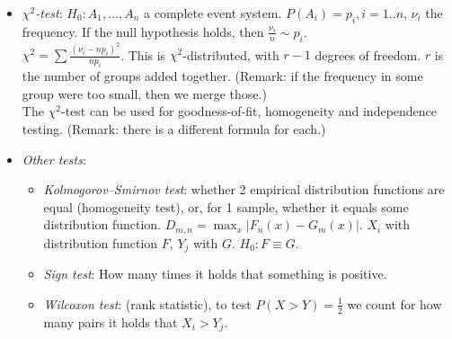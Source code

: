 \documentclass[margin=0px]{article}
\begin{document}
\begin{itemize}
    \item \textit{$\chi^2$-test}: $H_0: A_1,...,A_n$ a complete event system. $P(A_i) = p_i, i=1..n$, $\nu_i$ the frequency. If the null hypothesis holds, then $\frac{\nu_i}{n} \sim p_i$. \\
          $\chi^2 = \sum{\frac{(\nu_i - np_i)^2}{np_i}}$. This is $\chi^2$-distributed, with $r-1$ degrees of freedom. $r$ is the number of groups added together. (Remark: if the frequency in some group were too small, then we merge those.) \\
          The $\chi^2$-test can be used for goodness-of-fit, homogeneity and independence testing. (Remark: there is a different formula for each.)
    \item \textit{Other tests}:
          \begin{itemize}
              \item \textit{Kolmogorov--Smirnov test}: whether 2 empirical distribution functions are equal (homogeneity test), or, for 1 sample, whether it equals some distribution function. $D_{m,n} = \max_{x}{|F_n(x) - G_m(x)|}$. $X_i$ with distribution function $F$, $Y_j$ with $G$. $H_0 : F \equiv G$.
              \item \textit{Sign test}: How many times it holds that something is positive.
              \item \textit{Wilcoxon test}: (rank statistic), to test $P(X > Y) = \frac{1}{2}$ we count for how many pairs it holds that $X_i > Y_j$.
          \end{itemize}
\end{itemize}
\end{document}
